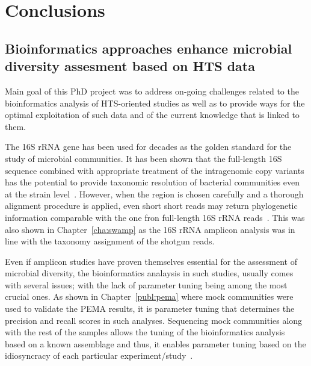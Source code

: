 % 
% 

\chapter{Conclusions}
\label{cha:conclusion}

\section{Bioinformatics approaches enhance microbial diversity assesment based on HTS data}
\label{concl:diversity}

   Main goal of this PhD project was to address on-going challenges 
   related to the bioinformatics analysis of HTS-oriented studies 
   as well as 
   to provide ways for the optimal exploitation of such data and of 
   the current knowledge that is linked to them. 

   The 16S rRNA gene has been used for decades as the golden standard for the 
   study of microbial communities. 
   It has been shown that the
   full-length 16S sequence
   combined with appropriate treatment of the 
   intragenomic copy variants 
   has the potential to provide taxonomic resolution of 
   bacterial communities even at the strain level~\citep{johnson_evaluation_2019}.
   However, when the region is chosen carefully 
   and a thorough alignment procedure is applied,
   even short short reads may return phylogenetic information 
   comparable with the one fron full-length 16S rRNA reads~\citep{jeraldo2011suitability}.
   This was also shown in Chapter~\ref{cha:swamp} as the 16S rRNA amplicon analysis 
   was in line with the taxonomy assignment of the shotgun reads. 

   Even if amplicon studies have proven themselves essential for the assessment of 
   microbial diversity, the bioinformatics analaysis in such studies, 
   usually comes with several issues; 
   with the lack of parameter tuning being among the most crucial ones. 
   As shown in Chapter~\ref{publ:pema} where mock communities were used to validate the PEMA results,
   it is parameter tuning that determines the 
   precision and recall scores in such analyses. 
   Sequencing mock communities along with the rest of the samples   
   allows the tuning of the bioinformatics analysis based on a known assemblage
   and thus, it enables parameter tuning based on the idiosyncracy of each particular experiment/study~\citep{bokulich2020measuring}.


